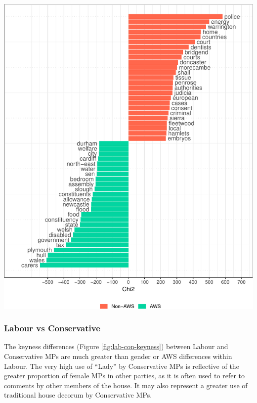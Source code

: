 \documentclass[]{article}
\let\origfigure\figure
\let\endorigfigure\endfigure
\renewenvironment{figure}[1][2] {
    \expandafter\origfigure\expandafter[H]
} {
    \endorigfigure
}
\theoremstyle{definition}
\theoremstyle{definition}
\theoremstyle{definition}
\theoremstyle{remark}
\begin{document}
\begin{figure}
\centering
\includegraphics{methodology_files/figure-latex/sl-keyness-1.pdf}
\caption{\label{fig:sl-keyness}Keyness between Female Labour MPs, by
Selection Process}
\end{figure}

\hypertarget{labour-vs-conservative}{%
\subsubsection{Labour vs Conservative}\label{labour-vs-conservative}}

The keyness differences (Figure \ref{fig:lab-con-keyness}) between
Labour and Conservative MPs are much greater than gender or AWS
differences within Labour. The very high use of ``Lady'' by Conservative
MPs is reflective of the greater proportion of female MPs in other
parties, as it is often used to refer to comments by other members of
the house. It may also represent a greater use of traditional house
decorum by Conservative MPs.
\end{document}

